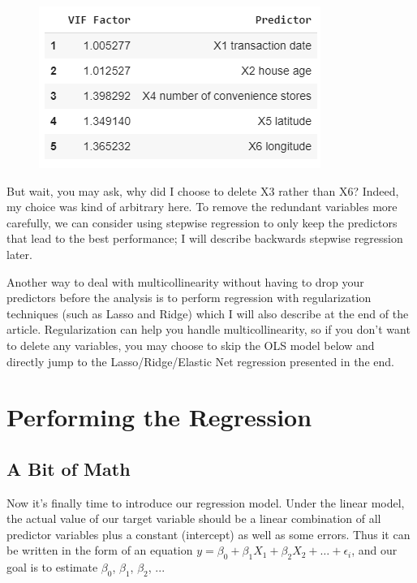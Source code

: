 \documentclass{article}
\begin{document}
\begin{figure}[H]\centering\includegraphics[width=0.5\linewidth]{13}\end{figure}
But wait, you may ask, why did I choose to delete X3 rather than X6? Indeed, my choice was kind of arbitrary here. To remove the redundant variables more carefully, we can consider using stepwise regression to only keep the predictors that lead to the best performance; I will describe backwards stepwise regression later.

Another way to deal with multicollinearity without having to drop your predictors before the analysis is to perform regression with regularization techniques (such as Lasso and Ridge) which I will also describe at the end of the article. Regularization can help you handle multicollinearity, so if you don't want to delete any variables, you may choose to skip the OLS model below and directly jump to the Lasso/Ridge/Elastic Net regression presented in the end.

\section*{Performing the Regression}
\subsection*{A Bit of Math}
Now it's finally time to introduce our regression model. Under the linear model, the actual value of our target variable should be a linear combination of all predictor variables plus a constant (intercept) as well as some errors. Thus it can be written in the form of an equation $y = \beta_0 + \beta_1 X_1 + \beta_2 X_2 + \dots + \epsilon_i$, and our goal is to estimate $\beta_0$, $\beta_1$, $\beta_2$, ...
\end{document}
